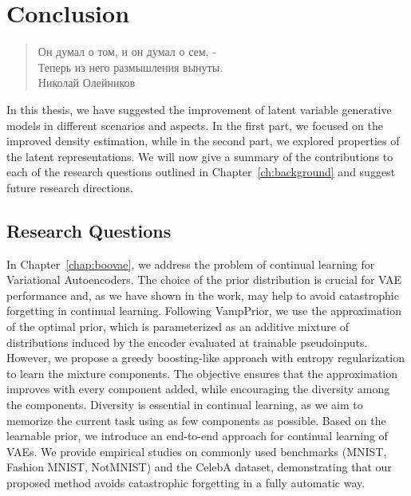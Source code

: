 \chapter{Conclusion}


\begin{quote}
\normalsize\itshape
\begin{flushright}
\foreignlanguage{russian}{Он думал о том, и он думал о сем, -}\\
\foreignlanguage{russian}{Теперь из него размышления вынуты.}  \\
\foreignlanguage{russian}{Николай Олейников} \\ \vskip 10pt
\end{flushright}
\end{quote}

In this thesis, we have suggested the improvement of latent variable generative models in different scenarios and aspects. In the first part, we focused on the improved density estimation, while in the second part, we explored properties of the latent representations. 
We will now give a summary of the contributions to each of the research questions outlined in Chapter~\ref{ch:background} and suggest future research directions.

\section{Research Questions}
In Chapter~\ref{chap:boovae}, we address the problem of continual learning for Variational Autoencoders. 
The choice of the prior distribution is crucial for VAE performance and, as we have shown in the work, may help to avoid catastrophic forgetting in continual learning. 
Following VampPrior, we use the approximation of the optimal prior, which is parameterized as an additive mixture of distributions induced by the encoder evaluated at trainable pseudoinputs. 
However, we propose a greedy boosting-like approach with entropy regularization to learn the mixture components. 
The objective ensures that the approximation improves with every component added, while encouraging the diversity among the components. 
Diversity is essential in continual learning, as we aim to memorize the current task using as few components as possible. 
Based on the learnable prior, we introduce an end-to-end approach for continual learning of VAEs. 
We provide empirical studies on commonly used benchmarks (MNIST, Fashion MNIST, NotMNIST) and the CelebA dataset, demonstrating that our proposed method avoids catastrophic forgetting in a fully automatic way.


